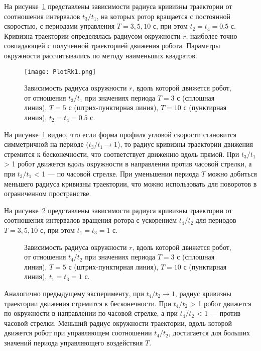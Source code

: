 На рисунке~\ref{Circle1} представлены зависимости радиуса кривизны траектории от соотношения интервалов $ t_3/t_1 $, на которых ротор вращается с постоянной скоростью, с периодами управления $ T=3,5,10 $ с, при этом $ t_2 = t_4 = 0.5$ с. Кривизна траектории определялась радиусом окружности $r$, наиболее точно совпадающей с полученной траекторией движения робота. Параметры окружности рассчитывались по методу наименьших квадратов. %

\begin{figure}[!h]
	\begin{center}
		\texttt{[image: PlotRk1.png]} \\ 
	\end{center}
	\caption{ Зависимость радиуса окружности $ r $, вдоль которой движется робот, от отношения $ t_3/t_1 $ при значениях периода $ T = 3$ с (сплошная линия), $T= 5$ с (штрих-пунктирная линия), $T = 10$ с (пунктирная линия), $ t_2 = t_4 = 0.5$ с.}
	\label{Circle1}
\end{figure}

На рисунке~\ref{Circle1} видно, что если форма профиля угловой скорости становится симметричной на периоде ($ t_3/t_1 \rightarrow 1 $), то радиус кривизны траектории движения стремится к бесконечности, что соответствует движению вдоль прямой. При $ t_3/t_1 $ > 1 робот движется вдоль окружности в направлении против часовой стрелки, а при $ t_3/t_1 $ < 1 --- по часовой стрелке. При уменьшении периода $ T $ можно добиться меньшего радиуса кривизны траектории, что можно использовать для поворотов в ограниченном пространстве.

На рисунке~\ref{Circle2} представлены зависимости радиуса кривизны траектории от соотношения интервалов вращения ротора с ускорением $ t_4/t_2 $ для периодов $ T=3,5,10 $ с, при этом $ t_1 = t_3 = 1$ с. 

\begin{figure}[!h]
	\caption{ Зависимость радиуса окружности $ r $, вдоль которой движется робот, от отношения $ t_4/t_2 $ при значениях периода $ T = 3$ с (сплошная линия), $T= 5$ с (штрих-пунктирная линия), $T = 10$ с (пунктирная линия), $t_1 = t_3 = 1$ с.}
	\label{Circle2}
\end{figure}

Аналогично предыдущему эксперименту, при $ t_4/t_2 \rightarrow 1$, радиус кривизны траектории движения стремится к бесконечности. При  $ t_4/t_2 $ > 1 робот движется по окружности в направлении по часовой стрелке, а при $ t_4/t_2 $ < 1 --- против часовой стрелки. Меньший радиус окружности траектории, вдоль которой движется робот при управляющем соотношении $ t_4/t_2 $, достигается для больших значений периода управляющего воздействия $ T $.

